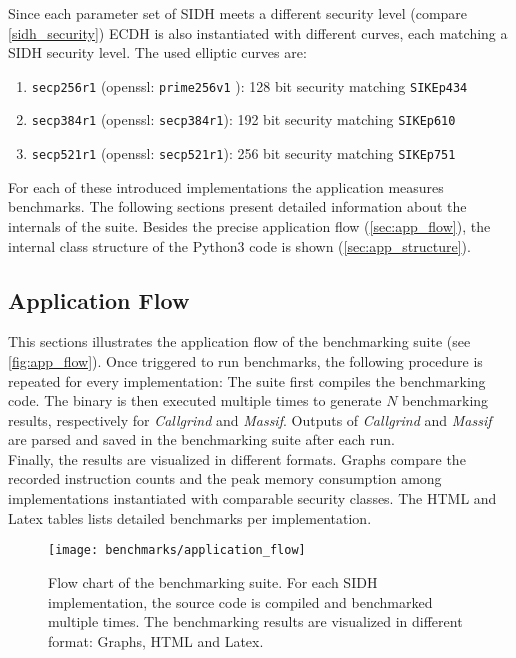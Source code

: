 Since each parameter set of SIDH meets a different security level (compare \autoref{sidh_security}) ECDH is also instantiated with different curves, each matching a SIDH security level. The used elliptic curves are:
\begin{enumerate}
\item \texttt{secp256r1} (openssl: \texttt{prime256v1} \parencite{turner2009elliptic}): 128 bit security matching \texttt{SIKEp434} \parencite{brown2010sec}
\item \texttt{secp384r1} (openssl: \texttt{secp384r1}): 192 bit security matching \texttt{SIKEp610} \parencite{brown2010sec}
\item \texttt{secp521r1} (openssl: \texttt{secp521r1}): 256 bit security  matching \texttt{SIKEp751} \parencite{brown2010sec}
\end{enumerate}
For each of these introduced implementations the application measures benchmarks. The following sections present detailed information about the internals of the suite. Besides the precise application flow (\autoref{sec:app_flow}), the internal class structure of the Python3 code is shown (\autoref{sec:app_structure}).

\subsection{Application Flow}\label{sec:app_flow}
This sections illustrates the application flow of the benchmarking suite (see \autoref{fig:app_flow}). Once triggered to run benchmarks, the following procedure is repeated for every implementation: The suite first compiles the benchmarking code. The binary is then executed multiple times to generate $N$ benchmarking results, respectively for \textit{Callgrind} and \textit{Massif}. Outputs of \textit{Callgrind} and \textit{Massif} are parsed and saved in the benchmarking suite after each run.
\\
Finally, the results are visualized in different formats. Graphs compare the recorded instruction counts and the peak memory consumption among implementations instantiated with comparable security classes. The HTML and Latex tables lists detailed benchmarks per implementation.

\begin{figure}[H]
  \centering
  \texttt{[image: benchmarks/application\_flow]}
  \caption[Flow chart of the benchmarking suite.]
  {Flow chart of the benchmarking suite. For each SIDH implementation, the source code is compiled and benchmarked multiple times. The benchmarking results are visualized in different format: Graphs, HTML and Latex.
  } \label{fig:app_flow}
\end{figure}




